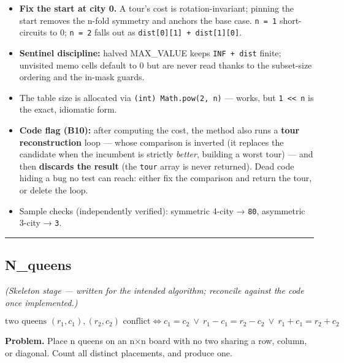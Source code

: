 \documentclass[
  10pt,
  letterpaper,
  onecolumn]{article}
\providecommand{\tightlist}{%
  \setlength{\itemsep}{0pt}\setlength{\parskip}{0pt}}
\begin{document}
\begin{itemize}
\tightlist
\item
  \textbf{Fix the start at city 0.} A tour's cost is rotation-invariant;
  pinning the start removes the n-fold symmetry and anchors the base
  case. \texttt{n\ =\ 1} short-circuits to 0; \texttt{n\ =\ 2} falls out
  as \texttt{dist{[}0{]}{[}1{]}\ +\ dist{[}1{]}{[}0{]}}.
\item
  \textbf{Sentinel discipline:} halved MAX\_VALUE keeps
  \texttt{INF\ +\ dist} finite; unvisited memo cells default to 0 but
  are never read thanks to the subset-size ordering and the in-mask
  guards.
\item
  The table size is allocated via \texttt{(int)\ Math.pow(2,\ n)} ---
  works, but \texttt{1\ \textless{}\textless{}\ n} is the exact,
  idiomatic form.
\item
  \textbf{Code flag (B10):} after computing the cost, the method also
  runs a \textbf{tour reconstruction} loop --- whose comparison is
  inverted (it replaces the candidate when the incumbent is strictly
  \emph{better}, building a worst tour) --- and then \textbf{discards
  the result} (the \texttt{tour} array is never returned). Dead code
  hiding a bug no test can reach: either fix the comparison and return
  the tour, or delete the loop.
\item
  Sample checks (independently verified): symmetric 4-city →
  \texttt{80}, asymmetric 3-city → \texttt{3}.
\end{itemize}

\begin{center}\rule{0.5\linewidth}{0.5pt}\end{center}

\hypertarget{n_queens}{%
\subsection{N\_queens}\label{n_queens}}

\emph{(Skeleton stage --- written for the intended algorithm; reconcile
against the code once implemented.)}

\begin{equation*}
\text{two queens }(r_1,c_1),(r_2,c_2)\text{ conflict}\iff
c_1=c_2 \ \lor\ r_1-c_1=r_2-c_2 \ \lor\ r_1+c_1=r_2+c_2
\end{equation*}

\textbf{Problem.} Place n queens on an n×n board with no two sharing a
row, column, or diagonal. Count all distinct placements, and produce
one.
\end{document}
